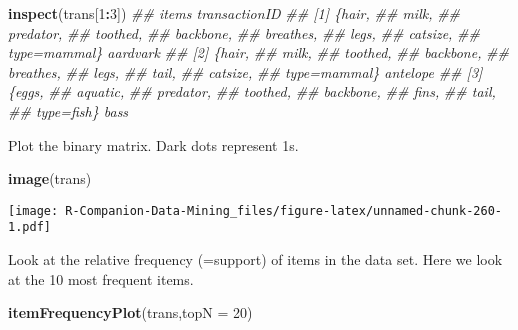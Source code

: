 \documentclass[
  notitlepage]{book}
\newenvironment{Shaded}{\begin{snugshade}}{\end{snugshade}}
\newcommand{\CommentTok}[1]{\textcolor[rgb]{0.56,0.35,0.01}{\textit{#1}}}
\newcommand{\DataTypeTok}[1]{\textcolor[rgb]{0.13,0.29,0.53}{#1}}
\newcommand{\DecValTok}[1]{\textcolor[rgb]{0.00,0.00,0.81}{#1}}
\newcommand{\KeywordTok}[1]{\textcolor[rgb]{0.13,0.29,0.53}{\textbf{#1}}}
\newcommand{\NormalTok}[1]{#1}
\newcommand{\OperatorTok}[1]{\textcolor[rgb]{0.81,0.36,0.00}{\textbf{#1}}}
\begin{document}
\begin{Shaded}
\begin{Highlighting}[]
\KeywordTok{inspect}\NormalTok{(trans[}\DecValTok{1}\OperatorTok{:}\DecValTok{3}\NormalTok{])}
\CommentTok{\#\#     items         transactionID}
\CommentTok{\#\# [1] \{hair,                     }
\CommentTok{\#\#      milk,                     }
\CommentTok{\#\#      predator,                 }
\CommentTok{\#\#      toothed,                  }
\CommentTok{\#\#      backbone,                 }
\CommentTok{\#\#      breathes,                 }
\CommentTok{\#\#      legs,                     }
\CommentTok{\#\#      catsize,                  }
\CommentTok{\#\#      type=mammal\}      aardvark}
\CommentTok{\#\# [2] \{hair,                     }
\CommentTok{\#\#      milk,                     }
\CommentTok{\#\#      toothed,                  }
\CommentTok{\#\#      backbone,                 }
\CommentTok{\#\#      breathes,                 }
\CommentTok{\#\#      legs,                     }
\CommentTok{\#\#      tail,                     }
\CommentTok{\#\#      catsize,                  }
\CommentTok{\#\#      type=mammal\}      antelope}
\CommentTok{\#\# [3] \{eggs,                     }
\CommentTok{\#\#      aquatic,                  }
\CommentTok{\#\#      predator,                 }
\CommentTok{\#\#      toothed,                  }
\CommentTok{\#\#      backbone,                 }
\CommentTok{\#\#      fins,                     }
\CommentTok{\#\#      tail,                     }
\CommentTok{\#\#      type=fish\}        bass}
\end{Highlighting}
\end{Shaded}

Plot the binary matrix. Dark dots represent 1s.

\begin{Shaded}
\begin{Highlighting}[]
\KeywordTok{image}\NormalTok{(trans)}
\end{Highlighting}
\end{Shaded}

\texttt{[image: R-Companion-Data-Mining\_files/figure-latex/unnamed-chunk-260-1.pdf]}

Look at the relative frequency (=support) of items in the data set. Here
we look at the 10 most frequent items.

\begin{Shaded}
\begin{Highlighting}[]
\KeywordTok{itemFrequencyPlot}\NormalTok{(trans,}\DataTypeTok{topN =} \DecValTok{20}\NormalTok{)}
\end{Highlighting}
\end{Shaded}
\end{document}
